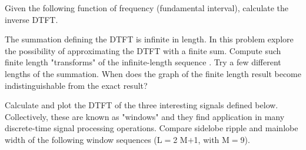 \documentclass{article}
\begin{document}
\begin{CellGroup}
\begin{CellGroup}
Given the following function of frequency (fundamental interval), calculate the inverse DTFT.

\begin{CellGroup}

\end{CellGroup}

\end{CellGroup}
\begin{CellGroup}
The summation defining the DTFT is infinite in length. In this problem explore the possibility of approximating the DTFT with a finite sum. Compute
such finite length "transforms" of the infinite-length sequence . Try
a few different lengths of the summation. When does the graph of the finite length result become indistinguishable from the exact result?




\end{CellGroup}
\begin{CellGroup}
Calculate and plot the DTFT of the three interesting signals defined below. Collectively, these are known as "windows" and they find application
in many discrete-time signal processing operations. Compare sidelobe ripple and mainlobe width of the following window sequences (L\(=\)2 M\(+\)1,
with M\(=\)9).


\end{CellGroup}
\end{CellGroup}
\end{document}
